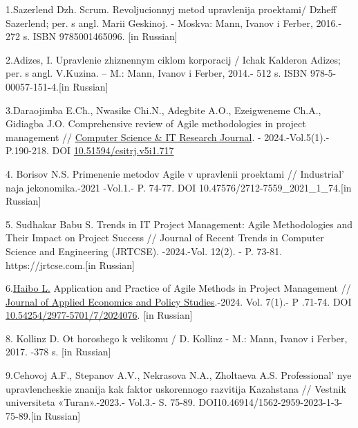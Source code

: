 \begin{references}

1.Sazerlend Dzh. Scrum. Revoljucionnyj metod upravlenija proektami/
Dzheff Sazerlend; per. s angl. Marii Geskinoj. - Moskva: Mann, Ivanov i
Ferber, 2016.- 272 s. ISBN 9785001465096.
{[}in Russian{]}

2.Adizes, I. Upravlenie zhiznennym ciklom korporacij / Ichak Kalderon
Adizes; per. s angl. V.Kuzina. -- M.: Mann, Ivanov i Ferber, 2014.- 512
s. ISBN 978-5-00057-151{\bfseries -}4.{[}in Russian{]}

3.Daraojimba E.Ch., Nwasike Chi.N., Adegbite A.O., Ezeigweneme Ch.A.,
Gidiagba J.O. Comprehensive review of Agile methodologies in project
management //
\href{https://www.researchgate.net/journal/Computer-Science-IT-Research-Journal-2709-0051?_tp=eyJjb250ZXh0Ijp7ImZpcnN0UGFnZSI6Il9kaXJlY3QiLCJwYWdlIjoicHVibGljYXRpb24iLCJwcmV2aW91c1BhZ2UiOiJfZGlyZWN0In19}{Computer
Science \& IT Research Journal}. - 2024.-Vol.5(1).- P.190-218. DOI
\href{http://dx.doi.org/10.51594/csitrj.v5i1.717}{10.51594/csitrj.v5i1.717}

4. Borisov N.S. Primenenie metodov Agile v upravlenii proektami //
Industrial' naja jekonomika.-2021 -Vol.1.- P. 74-77. DOI
10.47576/2712-7559\_2021\_1\_74.{[}in Russian{]}

5. Sudhakar Babu S. Trends in IT Project Management: Agile Methodologies
and Their Impact on Project Success // Journal of Recent Trends in
Computer Science and Engineering (JRTCSE). -2024.-Vol. 12(2). - P.
73-81. https://jrtcse.com.{[}in Russian{]}

6.\href{https://www.researchgate.net/scientific-contributions/Haibo-Li-2290691805?_tp=eyJjb250ZXh0Ijp7ImZpcnN0UGFnZSI6Il9kaXJlY3QiLCJwYWdlIjoicHVibGljYXRpb24iLCJwcmV2aW91c1BhZ2UiOiJfZGlyZWN0In19}{Haibo
L.} Application and Practice of Agile Methods in Project Management //
\href{https://www.researchgate.net/journal/Journal-of-Applied-Economics-and-Policy-Studies-2977-571X?_tp=eyJjb250ZXh0Ijp7ImZpcnN0UGFnZSI6Il9kaXJlY3QiLCJwYWdlIjoicHVibGljYXRpb24iLCJwcmV2aW91c1BhZ2UiOiJfZGlyZWN0In19}{Journal
of Applied Economics and Policy Studies}.-2024. Vol. 7(1).- P .71-74.
DOI
\href{http://dx.doi.org/10.54254/2977-5701/7/2024076}{10.54254/2977-5701/7/2024076}.
{[}in Russian{]}

8. Kollinz D. Ot horoshego k velikomu / D. Kollinz - M.: Mann, Ivanov i
Ferber, 2017. -378 s. {[}in Russian{]}

9.Cehovoj A.F., Stepanov A.V., Nekrasova N.A., Zholtaeva A.S.
Professional' nye upravlencheskie znanija kak faktor
uskorennogo razvitija Kazahstana // Vestnik universiteta «Turan».-2023.-
Vol.3.- S. 75-89. DOI10.46914/1562-2959-2023-1-3-75-89.{[}in Russian{]}


\end{references}
